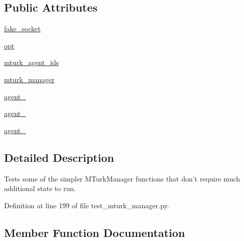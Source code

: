\subsection*{Public Attributes}
\begin{DoxyCompactItemize}
\item 
\hyperlink{classparlai_1_1mturk_1_1core_1_1test_1_1test__mturk__manager_1_1TestMTurkManagerUnitFunctions_a15bb604fcd47c565499246fdcef30fc1}{fake\+\_\+socket}
\item 
\hyperlink{classparlai_1_1mturk_1_1core_1_1test_1_1test__mturk__manager_1_1TestMTurkManagerUnitFunctions_adf881ec4960ee5eacaa4b9784a48e8c2}{opt}
\item 
\hyperlink{classparlai_1_1mturk_1_1core_1_1test_1_1test__mturk__manager_1_1TestMTurkManagerUnitFunctions_a82534c50942dca8e7b13b569d686a5a2}{mturk\+\_\+agent\+\_\+ids}
\item 
\hyperlink{classparlai_1_1mturk_1_1core_1_1test_1_1test__mturk__manager_1_1TestMTurkManagerUnitFunctions_a12c98ab0a2684925081f30e6d7bbe0ee}{mturk\+\_\+manager}
\item 
\hyperlink{classparlai_1_1mturk_1_1core_1_1test_1_1test__mturk__manager_1_1TestMTurkManagerUnitFunctions_a429b97c4910b2259402fb2fcaa46e4ea}{agent\+\_}
\item 
\hyperlink{classparlai_1_1mturk_1_1core_1_1test_1_1test__mturk__manager_1_1TestMTurkManagerUnitFunctions_aa31d9ee8614b716bc07624fd4010782f}{agent\+\_}
\item 
\hyperlink{classparlai_1_1mturk_1_1core_1_1test_1_1test__mturk__manager_1_1TestMTurkManagerUnitFunctions_afca9c68f641d642397a8b8f6167f38b9}{agent\+\_}
\end{DoxyCompactItemize}


\subsection{Detailed Description}
\begin{DoxyVerb}Tests some of the simpler MTurkManager functions that don't require much additional
state to run.
\end{DoxyVerb}
 

Definition at line 199 of file test\+\_\+mturk\+\_\+manager.\+py.



\subsection{Member Function Documentation}
\mbox{\label{classparlai_1_1mturk_1_1core_1_1test_1_1test__mturk__manager_1_1TestMTurkManagerUnitFunctions_af930e15dfec4de7c1b07b286ad2a4e07}} 
